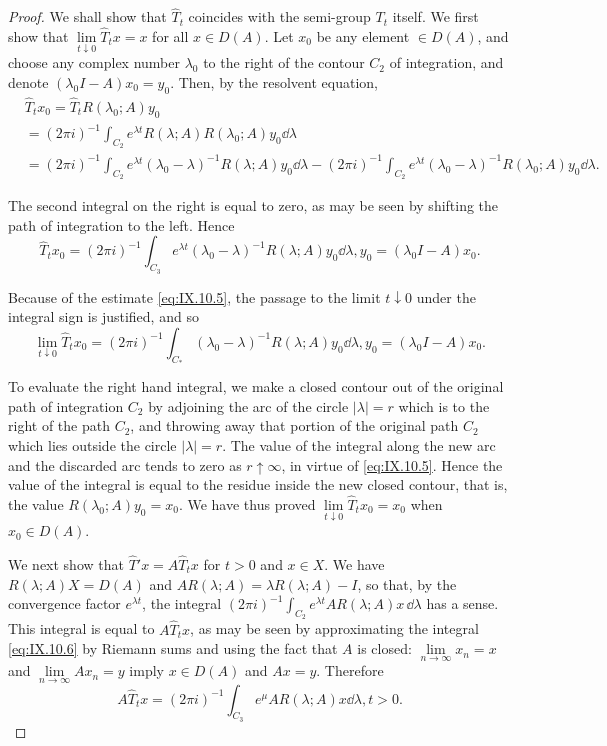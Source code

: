 \begin{proof}
We shall show that $\hat{T}_{t}$ coincides with the semi-group $T_{t}$ itself. We first show that $\lim\limits_{t\downarrow0}\hat{T}_{t}x=x$ for all $x\in D(A)$. Let $x_{0}$ be any element $\in D(A)$, and choose any complex number $\lambda_{0}$ to the right of the contour $C_{2}$ of integration, and denote $(\lambda_{0}I-A)x_{0}=y_{0}$. Then, by the resolvent equation, 
\[
\begin{aligned}
&\hat {T} _{t} x _{0} = \hat {T} _{t} R (\lambda_{0}; A) y _{0}
\\
&= (2 \pi i) ^{-1} \int_ {C _{2}} e ^{\lambda t} R (\lambda ; A) R (\lambda_{0}; A) y _{0} \dd \lambda
\\
&= (2 \pi i) ^{-1} \int_ {C _{2}} e ^{\lambda t} (\lambda_{0} - \lambda) ^{-1} R (\lambda ; A) y _{0} \dd \lambda - (2 \pi i) ^{-1} \int_ {C _{2}} e ^{\lambda t} (\lambda_{0} - \lambda) ^{-1} R (\lambda_{0}; A) y _{0} \dd \lambda .
\end{aligned}
\]

The second integral on the right is equal to zero, as may be seen by shifting the path of integration to the left. Hence 
\[
\hat {T} _{t} x _{0} = (2 \pi i) ^{-1} \int_ {C _{3}} e ^{\lambda t} (\lambda_{0} - \lambda) ^{-1} R (\lambda ; A) y _{0} \dd \lambda , y _{0} = (\lambda_{0} I - A) x _{0}.
\]

Because of the estimate \eqref{eq:IX.10.5}, the passage to the limit $t \downarrow 0$ under the integral sign is justified, and so 
\[
\lim\limits _{t \downarrow 0} \hat {T} _{t} x _{0} = (2 \pi i) ^{-1} \int_ {C _{*}} (\lambda_{0} - \lambda) ^{-1} R (\lambda ; A) y _{0} \dd \lambda , y _{0} = (\lambda_{0} I - A) x _{0}.
\]

To evaluate the right hand integral, we make a closed contour out of the original path of integration $C_2$ by adjoining the arc of the circle $|\lambda| = r$ which is to the right of the path $C_2$, and throwing away that portion of the original path $C_2$ which lies outside the circle $|\lambda| = r$. The value of the integral along the new arc and the discarded arc tends to zero as $r \uparrow \infty$, in virtue of \eqref{eq:IX.10.5}. Hence the value of the integral is equal to the residue inside the new closed contour, that is, the value $R(\lambda_0; A) y_0 = x_0$. We have thus proved $\lim\limits_{t \downarrow 0} \hat{T}_t x_0 = x_0$ when $x_0 \in D(A)$. 

We next show that $\hat{T}'x = A\hat{T}_t x$ for $t > 0$ and $x \in X$. We have $R(\lambda; A)X = D(A)$ and $AR(\lambda; A) = \lambda R(\lambda; A) - I$, so that, by the
convergence factor $e^{\lambda t}$, the integral $(2\pi i)^{-1} \int_{C_2} e^{\lambda t} A R(\lambda; A)x \, \dd\lambda$ has a sense. This integral is equal to $A \hat{T}_t x$, as may be seen by approximating the integral \eqref{eq:IX.10.6} by Riemann sums and using the fact that $A$ is closed: $\lim\limits_{n \to \infty} x_n = x$ and $\lim\limits_{n \to \infty} A x_n = y$ imply $x \in D(A)$ and $Ax = y$. Therefore 
\[
A \hat {T} _{t} x = (2 \pi i) ^{-1} \int_ {C _{3}} e ^{\mu} A R (\lambda ; A) x \dd \lambda , t > 0.
\]


\end{proof}
